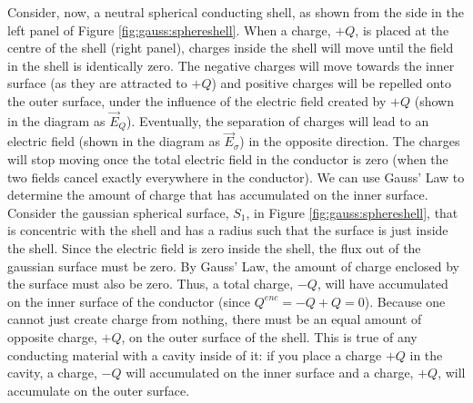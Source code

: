 Consider, now, a neutral spherical conducting shell, as shown from the side in the left panel of Figure \ref{fig:gauss:sphereshell}. When a charge, $+Q$, is placed at the centre of the shell (right panel), charges inside the shell will move until the field in the shell is identically zero. The negative charges will move towards the inner surface (as they are attracted to $+Q$) and positive charges will be repelled onto the outer surface, under the influence of the electric field created by $+Q$ (shown in the diagram as $\vec E_{Q}$). Eventually, the separation of charges will lead to an electric field (shown in the diagram as $\vec E_{\sigma}$) in the opposite direction. The charges will stop moving once the total electric field in the conductor is zero (when the two fields cancel exactly everywhere in the conductor).
We can use Gauss' Law to determine the amount of charge that has accumulated on the inner surface. Consider the gaussian spherical surface, $S_1$, in Figure \ref{fig:gauss:sphereshell}, that is concentric with the shell and has a radius such that the surface is just inside the shell. Since the electric field is zero inside the shell, the flux out of the gaussian surface must be zero. By Gauss' Law, the amount of charge enclosed by the surface must also be zero. Thus, a total charge, $-Q$, will have accumulated on the inner surface of the conductor (since $Q^{enc}=-Q+Q=0$). Because one cannot just create charge from nothing, there must be an equal amount of opposite charge, $+Q$, on the outer surface of the shell. This is true of any conducting material with a cavity inside of it: if you place a charge $+Q$ in the cavity, a charge, $-Q$ will accumulated on the inner surface and a charge, $+Q$, will accumulate on the outer surface.

